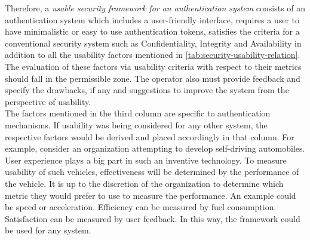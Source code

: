 \begin{center}
\begin{table}
\caption{Possible values for metrics}
\label{tab:possible-values}
\end{table}
\end{center}

Therefore, a \textit{usable security framework for an authentication system} consists of an authentication system which includes a user-friendly interface, requires a user to have minimalistic or easy to use authentication tokens, satisfies the criteria for a conventional security system such as Confidentiality, Integrity and Availability in addition to all the usability factors mentioned in \ref{tab:security-usability-relation}. The evaluation of these factors via usability criteria with respect to their metrics should fall in the permissible zone. The operator also must provide feedback and specify the drawbacks, if any and suggestions to improve the system from the perspective of usability. \\
The factors mentioned in the third column are specific to authentication mechanisms. If usability was being considered for any other system, the respective factors would be derived and placed accordingly in that column. For example, consider an organization attempting to develop self-driving automobiles. User experience plays a big part in such an inventive technology. To measure usability of such vehicles, effectiveness will be determined by the performance of the vehicle. It is up to the discretion of the organization to determine which metric they would prefer to use to measure the performance. An example could be speed or acceleration. Efficiency can be measured by fuel consumption. Satisfaction can be measured by user feedback. In this way, the framework could be used for any system.


